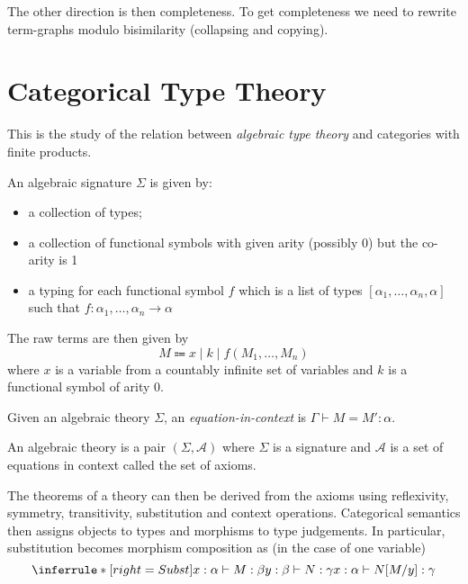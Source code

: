 \documentclass[acmsmall,screen, nonacm, anonymous]{acmart}
\begin{document}
The other direction is then completeness.
To get completeness we need to rewrite term-graphs modulo bisimilarity (collapsing and copying).

\section{Categorical Type Theory}

This is the study of the relation between \textit{algebraic type theory} and categories with finite products.

\begin{definition}

An algebraic signature $\Sigma$ is given by:
\begin{itemize}

\item a collection of types;
\item a collection of functional symbols with given arity (possibly 0) but the co-arity is 1
\item a typing for each functional symbol $f$ which is a list of types $[\alpha_1, \ldots, \alpha_n, \alpha]$ such that $f : \alpha_1, \ldots, \alpha_{n} \to \alpha$
\end{itemize}

The raw terms are then given by
\[
 M \Coloneqq x \;|\; k \;|\; f(M_1, \ldots, M_{n})
\]
where $x$ is a variable from a countably infinite set of variables and $k$ is a functional symbol of arity 0.
\end{definition}

Given an algebraic theory $\Sigma$, an \textit{equation-in-context} is $\Gamma \vdash M = M' : \alpha$.

\begin{definition}

An algebraic theory is a pair $(\Sigma, \mathcal{A})$ where $\Sigma$ is a signature and $\mathcal{A}$ is a set of equations in context called the set of axioms.
\end{definition}

The theorems of a theory can then be derived from the axioms using reflexivity, symmetry, transitivity, substitution and context operations.
Categorical semantics then assigns objects to types and morphisms to type judgements.
In particular, substitution becomes morphism composition as (in the case of one variable)
\[
\inferrule*[right=Subst]
  { x : \alpha \vdash M : \beta  \\ y : \beta \vdash N : \gamma }
  { x : \alpha \vdash N[M / y] : \gamma }
\]
\end{document}
